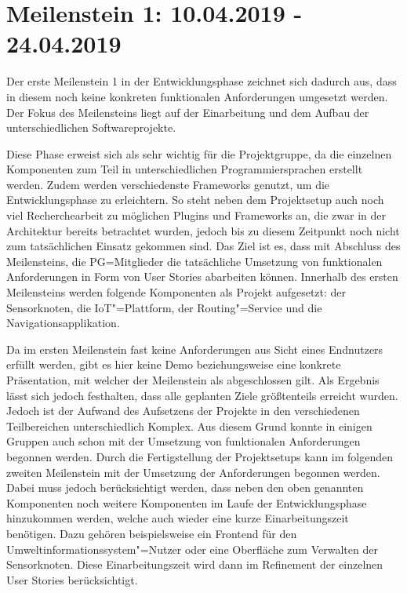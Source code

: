 \section{Meilenstein 1: 10.04.2019 - 24.04.2019}
Der erste Meilenstein 1 in der Entwicklungsphase zeichnet sich dadurch aus, dass in diesem noch keine konkreten funktionalen Anforderungen umgesetzt werden.
Der Fokus des Meilensteins liegt auf der Einarbeitung und dem Aufbau der unterschiedlichen Softwareprojekte.

Diese Phase erweist sich als sehr wichtig für die Projektgruppe, da die einzelnen Komponenten zum Teil in unterschiedlichen Programmiersprachen erstellt werden.
Zudem werden verschiedenste Frameworks genutzt, um die Entwicklungsphase zu erleichtern.
So steht neben dem Projektsetup auch noch viel Recherchearbeit zu möglichen Plugins und Frameworks an, die zwar in der Architektur bereits betrachtet wurden, jedoch bis zu diesem Zeitpunkt noch nicht zum tatsächlichen Einsatz gekommen sind.
Das Ziel ist es, dass mit Abschluss des Meilensteins, die PG=Mitglieder die tatsächliche Umsetzung von funktionalen Anforderungen in Form von User Stories abarbeiten können.
Innerhalb des ersten Meilensteins werden folgende Komponenten als Projekt aufgesetzt: der Sensorknoten, die IoT"=Plattform, der Routing"=Service und die Navigationsapplikation.

Da im ersten Meilenstein fast keine Anforderungen aus Sicht eines Endnutzers erfüllt werden, gibt es hier keine Demo beziehungsweise eine konkrete Präsentation, mit welcher der Meilenstein als abgeschlossen gilt.
Als Ergebnis lässt sich jedoch festhalten, dass alle geplanten Ziele größtenteils erreicht wurden.
Jedoch ist der Aufwand des Aufsetzens der Projekte in den verschiedenen Teilbereichen unterschiedlich Komplex.
Aus diesem Grund konnte in einigen Gruppen auch schon mit der Umsetzung von funktionalen Anforderungen begonnen werden.
Durch die Fertigstellung der Projektsetups kann im folgenden zweiten Meilenstein mit der Umsetzung der Anforderungen begonnen werden.
Dabei muss jedoch berücksichtigt werden, dass neben den oben genannten Komponenten noch weitere Komponenten im Laufe der Entwicklungsphase hinzukommen werden, welche auch wieder eine kurze Einarbeitungszeit benötigen.
Dazu gehören beispielsweise ein Frontend für den Umweltinformationssystem"=Nutzer oder eine Oberfläche zum Verwalten der Sensorknoten.
Diese Einarbeitungszeit wird dann im Refinement der einzelnen User Stories berücksichtigt.